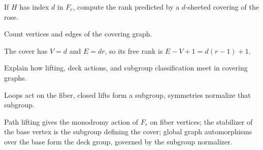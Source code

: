 \begin{exercise}\label{exr:viii14-ped-15}
If $H$ has index $d$ in $F_r$, compute the rank predicted by a $d$-sheeted covering of the rose.
\end{exercise}
\begin{hint}
Count vertices and edges of the covering graph.
\end{hint}
\begin{solution}
The cover has $V=d$ and $E=dr$, so its free rank is $E-V+1=d(r-1)+1$.
\end{solution}

\begin{exercise}\label{exr:viii14-ped-16}
Explain how lifting, deck actions, and subgroup classification meet in covering graphs.
\end{exercise}
\begin{hint}
Loops act on the fiber, closed lifts form a subgroup, symmetries normalize that subgroup.
\end{hint}
\begin{solution}
Path lifting gives the monodromy action of $F_r$ on fiber vertices; the stabilizer of the base vertex is the subgroup defining the cover; global graph automorphisms over the base form the deck group, governed by the subgroup normalizer.
\end{solution}

